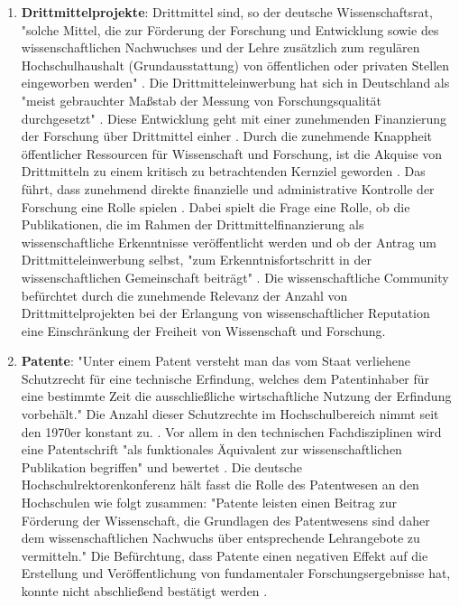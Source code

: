 \begin{enumerate}
\begin{end}
\begin{enumerate}
\item \textbf{Drittmittelprojekte}: Drittmittel sind, so der deutsche Wissenschaftsrat, "solche Mittel, die zur Förderung der Forschung und Entwicklung sowie des wissenschaftlichen Nachwuchses und der Lehre zusätzlich zum regulären Hochschulhaushalt (Grundausstattung) von öffentlichen oder privaten Stellen eingeworben werden" \cite{wr_2014}. Die Drittmitteleinwerbung hat sich in Deutschland als "meist gebrauchter Maßstab der Messung von Forschungsqualität durchgesetzt" \cite{M_nch_2006}. Diese Entwicklung geht mit einer zunehmenden Finanzierung der Forschung über Drittmittel einher \cite{Neidhardt_2010} \cite{Jansen_2007} \cite{simon_2009_wissenschaft_governance}. Durch die zunehmende Knappheit öffentlicher Ressourcen für Wissenschaft und Forschung, ist die Akquise von Drittmitteln zu einem kritisch zu betrachtenden Kernziel geworden \cite{Jansen_2007}. Das führt, dass zunehmend direkte finanzielle und administrative Kontrolle der Forschung eine Rolle spielen \cite{Barl_sius_2008}. Dabei spielt die Frage eine Rolle, ob die Publikationen, die im Rahmen der Drittmittelfinanzierung als wissenschaftliche Erkenntnisse veröffentlicht werden und ob der Antrag um Drittmitteleinwerbung selbst, "zum Erkenntnisfortschritt in der wissenschaftlichen Gemeinschaft beiträgt" \cite{M_nch_2006}. Die wissenschaftliche Community befürchtet durch die zunehmende Relevanz der Anzahl von Drittmittelprojekten bei der Erlangung von wissenschaftlicher Reputation eine Einschränkung der Freiheit von Wissenschaft und Forschung.
\item \textbf{Patente}: "Unter einem Patent versteht man das vom Staat verliehene Schutzrecht für eine technische Erfindung, welches dem Patentinhaber für eine bestimmte Zeit die ausschließliche wirtschaftliche Nutzung der Erfindung vorbehält." \cite{greif_2003_patente} Die Anzahl dieser Schutzrechte im Hochschulbereich nimmt seit den 1970er konstant zu. \cite{schmoch_2003_hochschulforschung} \cite{Fabrizio_2008}. Vor allem in den technischen Fachdisziplinen wird eine Patentschrift "als funktionales Äquivalent zur wissenschaftlichen Publikation begriffen" und bewertet \cite{mersch_2014_patente}. Die deutsche Hochschulrektorenkonferenz hält fasst die Rolle des Patentwesen an den Hochschulen wie folgt zusammen: "Patente leisten einen Beitrag zur Förderung der Wissenschaft, die Grundlagen des Patentwesens sind daher dem wissenschaftlichen Nachwuchs über entsprechende Lehrangebote zu vermitteln." \cite{suchen-Position-HRK} Die Befürchtung, dass Patente einen negativen Effekt auf die Erstellung und Veröffentlichung von fundamentaler Forschungsergebnisse hat, konnte nicht abschließend bestätigt werden \cite{Fabrizio_2008}.

\end{enumerate}
\end{end}
\end{enumerate}
